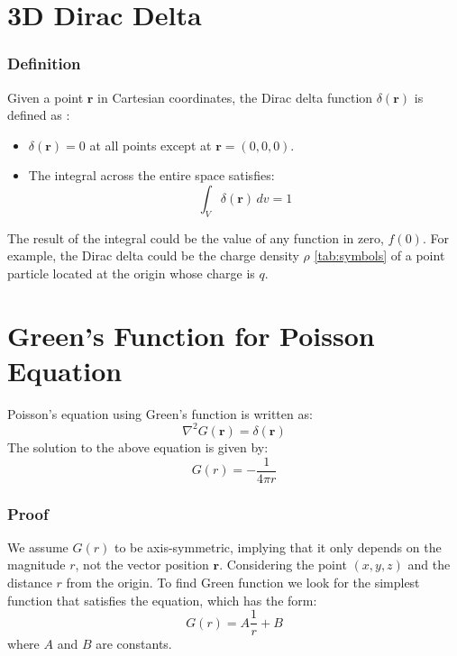 \section{3D Dirac Delta}
\subsubsection{Definition}

Given a point \(\mathbf{r}\) in Cartesian coordinates, the Dirac delta function \(\delta(\mathbf{r})\) is defined as \cite{book-magnetism2}:
\begin{itemize}
    \item \(\delta(\mathbf{r}) = 0\) at all points except at \(\mathbf{r} = (0,0,0)\).
    \item The integral across the entire space satisfies:
    \begin{equation}
    \int_V \delta(\mathbf{r}) \, dv = 1
    \label{eq:dirac}
    \end{equation}
\end{itemize}

The result of the integral could be the value of any function in zero, $f(0)$.
For example, the Dirac delta could be the charge density $\rho$ \ref{tab:symbols} of a point particle located at the origin whose charge is \(q\).

\section{Green's Function for Poisson Equation}
Poisson's equation using Green's function is written as:
\begin{equation}
\nabla^2 G(\mathbf{r}) = \delta(\mathbf{r})
\label{eq:poisson}
\end{equation}
The solution to the above equation is given by:
\[
G(r) =  - \frac{1}{4 \pi r}
\]
\subsubsection{Proof}
We assume \(G(r)\) to be axis-symmetric, implying that it only depends on the magnitude $r$, not the vector position $\mathbf{r}$.
Considering the point \((x,y,z)\) and the distance \(r\) from the origin.
To find Green function we look for the simplest function that satisfies the equation, which has the form:
\[
G(r) = A \frac{1}{r} + B
\]
where \(A\) and \(B\) are constants. 

